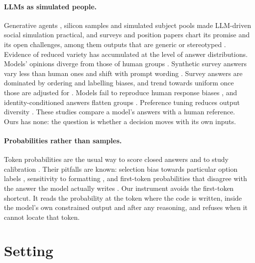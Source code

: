 \documentclass[11pt]{article}
\begin{document}
\paragraph{LLMs as simulated people.} Generative agents \citep{park2023generative}, silicon
samples \citep{argyle2023outofone} and simulated subject pools \citep{aher2023turing} made LLM-driven social simulation practical, and
surveys and position papers chart its promise and its open challenges, among them outputs that
are generic or stereotyped \citep{gao2024abmsurvey,anthis2025position}. Evidence of reduced
variety has accumulated at the level of answer distributions. Models' opinions diverge from those
of human groups \citep{santurkar2023whose}. Synthetic survey answers vary less than human ones
and shift with prompt wording \citep{bisbee2024synthetic}. Survey answers are dominated by
ordering and labelling biases, and trend towards uniform once those are adjusted for
\citep{dominguezolmedo2024questioning}. Models fail to reproduce human response biases
\citep{tjuatja2024responsebiases}, and identity-conditioned answers flatten groups
\citep{wang2025flatten}. Preference tuning reduces output diversity \citep{kirk2024rlhf}. These
studies compare a model's answers with a human reference. Ours has none: the question is whether
a decision moves with its own inputs.

\paragraph{Probabilities rather than samples.} Token probabilities are the usual way to score
closed answers and to study calibration \citep{kadavath2022know}. Their pitfalls are known:
selection bias towards particular option labels \citep{zheng2024selectors}, sensitivity to
formatting \citep{sclar2024formatting}, and first-token probabilities that disagree with the
answer the model actually writes \citep{wang2024myanswerisc}. Our instrument avoids the
first-token shortcut. It reads the probability at the token where the code is written, inside
the model's own constrained output and after any reasoning, and refuses when it cannot locate
that token.

\section{Setting}
\label{sec:setting}
\end{document}
